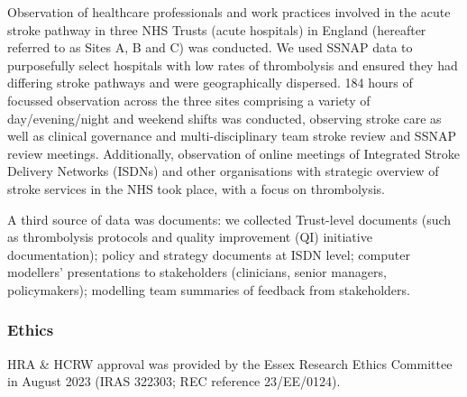Observation of healthcare professionals and work practices involved in the acute stroke pathway in three NHS Trusts (acute hospitals) in England (hereafter referred to as Sites A, B and C) was conducted. We used SSNAP data to purposefully select hospitals with low rates of thrombolysis and ensured they had differing stroke pathways and were geographically dispersed. 184 hours of focussed observation across the three sites comprising a variety of day/evening/night and weekend shifts was conducted, observing stroke care as well as clinical governance and multi-disciplinary team stroke review and SSNAP review meetings. Additionally, observation of online meetings of Integrated Stroke Delivery Networks (ISDNs) and other organisations with strategic overview of stroke services in the NHS took place, with a focus on thrombolysis. 

A third source of data was documents: we collected Trust-level documents (such as thrombolysis protocols and quality improvement (QI) initiative documentation); policy and strategy documents at ISDN level; computer modellers’ presentations to stakeholders (clinicians, senior managers, policymakers); modelling team summaries of feedback from stakeholders.

\subsubsection{Ethics}

HRA \& HCRW approval was provided by the Essex Research Ethics Committee in August 2023 (IRAS 322303; REC reference 23/EE/0124).